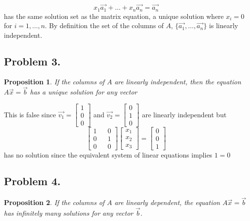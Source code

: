 \documentclass[12pt, letterpaper]{article}
\theoremstyle{statement}
\newtheorem*{atmProp}{Proposition}
\begin{document}
    $$x_1\vec{a_1} + \dots + x_n\vec{a_n} = \vec{a_n}$$ has the same solution set as the matrix equation, a unique solution where $x_i = 0$ for $i = 1,\dots, n$. By definition the set of the columns of $A$, $\{\vec{a_1}, \dots, \vec{a_n}\}$ is linearly independent.
    
    \subsection*{Problem 3.}
    \begin{atmProp}
    If the columns of $A$ are linearly independent, then the equation $A\vec{x}=\vec{b}$ has a unique solution for any vector 
    \end{atmProp} 
    
    This is false since $\vec{v_1} = \begin{bmatrix} 1 \\ 0 \\ 0 \end{bmatrix}$ and $\vec{v_2} = \begin{bmatrix} 0 \\ 1 \\ 0  \end{bmatrix}$ are linearly independent but $$\begin{bmatrix} 1 && 0 \\ 0 && 1 \\ 0 && 0 \end{bmatrix} \begin{bmatrix} x_1 \\ x_2 \\ x_3\end{bmatrix} = \begin{bmatrix} 0\\0\\1 \end{bmatrix}$$ has no solution since the equivalent system of linear equations implies $1 = 0$
    
    \subsection*{Problem 4.}
    \begin{atmProp}
    If the columns of $A$ are linearly dependent, the equation $A\vec{x} = \vec{b}$ has infinitely many solutions for any vector $\vec{b}$.
    \end{atmProp}
    
\end{document}
